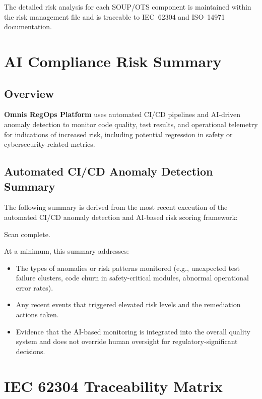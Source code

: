 \documentclass[11pt]{article}
\begin{document}
The detailed risk analysis for each SOUP/OTS component is maintained within the
risk management file and is traceable to IEC~62304 and ISO~14971 documentation.

\newpage

\section{AI Compliance Risk Summary}

\subsection{Overview}
\textbf{Omnis RegOps Platform} uses automated CI/CD pipelines and AI-driven anomaly
detection to monitor code quality, test results, and operational telemetry for
indications of increased risk, including potential regression in safety or
cybersecurity-related metrics.

\subsection{Automated CI/CD Anomaly Detection Summary}
The following summary is derived from the most recent execution of the automated
CI/CD anomaly detection and AI-based risk scoring framework:

\medskip
\noindent
Scan complete.
\medskip

At a minimum, this summary addresses:
\begin{itemize}
    \item The types of anomalies or risk patterns monitored (e.g., unexpected
          test failure clusters, code churn in safety-critical modules, abnormal
          operational error rates).
    \item Any recent events that triggered elevated risk levels and the
          remediation actions taken.
    \item Evidence that the AI-based monitoring is integrated into the overall
          quality system and does not override human oversight for
          regulatory-significant decisions.
\end{itemize}

\newpage

\section{IEC 62304 Traceability Matrix}
\end{document}
